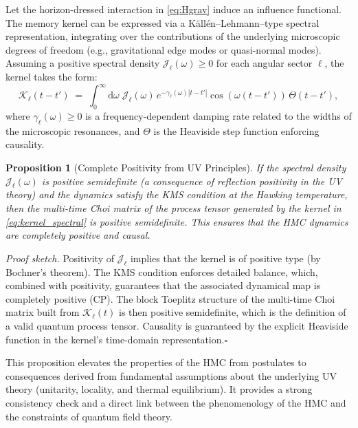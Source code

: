 \documentclass[a4paper,11pt]{article}
\newcommand{\eg}{e.g.\xspace}
\newcommand{\HMC}{\textsc{HMC}\xspace}
\theoremstyle{plain}
\newtheorem{proposition}{Proposition}
\theoremstyle{definition}
\theoremstyle{remark}
\begin{document}
Let the horizon-dressed interaction in \eqref{eq:Hgrav} induce an influence functional. The memory kernel can be expressed via a K\"all\'en--Lehmann--type spectral representation, integrating over the contributions of the underlying microscopic degrees of freedom (\eg, gravitational edge modes or quasi-normal modes). Assuming a positive spectral density $\mathcal{J}_\ell(\omega)\ge 0$ for each angular sector $\ell$, the kernel takes the form:
\begin{equation}
\mathcal{K}_\ell(t-t')\;=\;\int_0^\infty\! \mathrm{d}\omega\; \mathcal{J}_\ell(\omega)\, e^{-\gamma_\ell(\omega) |t-t'|}\cos(\omega (t-t'))\,\Theta(t-t'),
\label{eq:kernel_spectral}
\end{equation}
where $\gamma_\ell(\omega)\ge 0$ is a frequency-dependent damping rate related to the widths of the microscopic resonances, and $\Theta$ is the Heaviside step function enforcing causality.

\begin{proposition}[Complete Positivity from UV Principles]
\label{prop:uv-kernel}
If the spectral density $\mathcal{J}_\ell(\omega)$ is positive semidefinite (a consequence of reflection positivity in the UV theory) and the dynamics satisfy the KMS condition at the Hawking temperature, then the multi-time Choi matrix of the process tensor generated by the kernel in \eqref{eq:kernel_spectral} is positive semidefinite. This ensures that the \HMC{} dynamics are completely positive and causal.
\end{proposition}

\textit{Proof sketch.} Positivity of $\mathcal{J}_\ell$ implies that the kernel is of positive type (by Bochner's theorem). The KMS condition enforces detailed balance, which, combined with positivity, guarantees that the associated dynamical map is completely positive (CP). The block Toeplitz structure of the multi-time Choi matrix built from $\mathcal{K}_\ell(t)$ is then positive semidefinite, which is the definition of a valid quantum process tensor. Causality is guaranteed by the explicit Heaviside function in the kernel's time-domain representation.\hfill$\square$

This proposition elevates the properties of the \HMC{} from postulates to consequences derived from fundamental assumptions about the underlying UV theory (unitarity, locality, and thermal equilibrium). It provides a strong consistency check and a direct link between the phenomenology of the \HMC{} and the constraints of quantum field theory.
\end{document}
